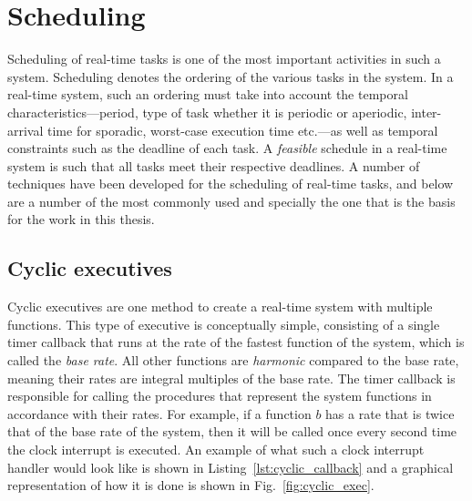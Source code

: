 \section{Scheduling}
\label{sec:scheduling}
Scheduling of real-time tasks is one of the most important activities
in such a system. Scheduling denotes the ordering of the various tasks
in the system. In a real-time system, such an ordering must take into
account the temporal characteristics---period, type of task whether it
is periodic or aperiodic, inter-arrival time for sporadic, worst-case
execution time etc.---as well as temporal constraints such as the
deadline of each task. A \emph{feasible} schedule in a real-time
system is such that all tasks meet their respective deadlines. A
number of techniques have been developed for the scheduling of
real-time tasks, and below are a number of the most commonly used and
specially the one that is the basis for the work in this thesis.

\subsection{Cyclic executives}
Cyclic executives are one method to create a real-time system with
multiple functions. This type of executive is conceptually simple,
consisting of a single timer callback that runs at the rate of the
fastest function of the system, which is called the \emph{base
  rate}. All other functions are \emph{harmonic} compared to the base
rate, meaning their rates are integral multiples of the base rate. The
timer callback is responsible for calling the procedures that
represent the system functions in accordance with their rates. For
example, if a function $b$ has a rate that is twice that of the base
rate of the system, then it will be called once every second time the
clock interrupt is executed. An example of what such a clock interrupt
handler would look like is shown in Listing~\ref{lst:cyclic_callback}
and a graphical representation of how it is done is shown in
Fig.~\ref{fig:cyclic_exec}.

